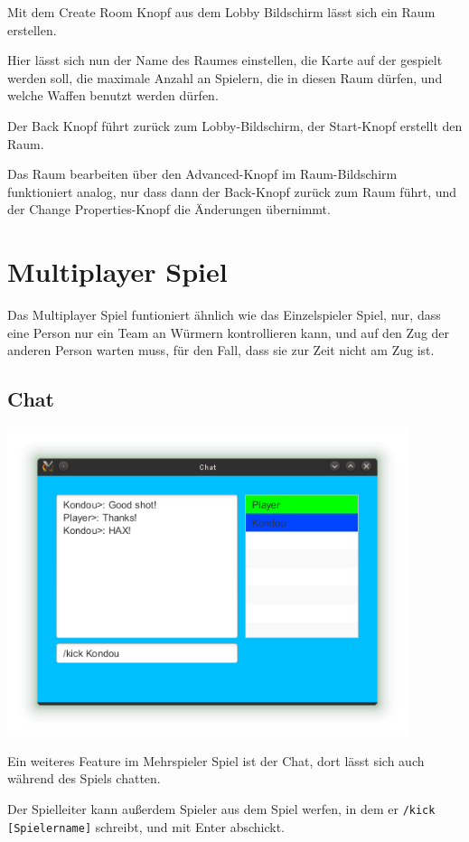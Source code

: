 \documentclass{scrreprt}
\begin{document}
Mit dem Create Room Knopf aus dem Lobby Bildschirm lässt sich ein Raum erstellen.

Hier lässt sich nun der Name des Raumes einstellen, die Karte auf der gespielt werden soll, die maximale Anzahl an Spielern, die
in diesen Raum dürfen, und welche Waffen benutzt werden dürfen.

Der Back Knopf führt zurück zum Lobby-Bildschirm, der Start-Knopf erstellt den Raum.

Das Raum bearbeiten über den Advanced-Knopf im Raum-Bildschirm funktioniert analog, nur dass dann der Back-Knopf zurück zum Raum
führt, und der Change Properties-Knopf die Änderungen übernimmt.

\section{Multiplayer Spiel}

Das Multiplayer Spiel funtioniert ähnlich wie das Einzelspieler Spiel, nur, dass eine Person nur ein Team an Würmern kontrollieren
kann, und auf den Zug der anderen Person warten muss, für den Fall, dass sie zur Zeit nicht am Zug ist.

\subsection{Chat}

\includegraphics[height=9cm]{Screenshot12.png}

Ein weiteres Feature im Mehrspieler Spiel ist der Chat, dort lässt sich auch während des Spiels chatten.

Der Spielleiter kann außerdem Spieler aus dem Spiel werfen, in dem er \texttt{/kick [Spielername]} schreibt, und mit Enter
abschickt.
\end{document}
